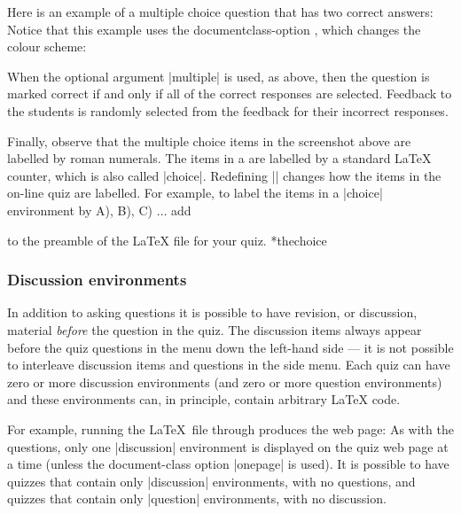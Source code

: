 \documentclass[svgnames]{article}
\makeatletter
\newcommand\macroIndex[1]{%
  \lowercase{\def\temp{#1}}%
  \expandafter\index\expandafter{\temp@\textbackslash#1}%
}
\makeatother
\begin{document}
  Here is an example of a multiple choice question that has
  two correct answers:
    \label{choice-multiple}
  Notice that this example uses the documentclass-option
  , which changes the colour scheme:

  When the optional argument \LatexCode|multiple| is used, as above, then the
  question is marked correct if and only if all of the correct responses
  are selected. Feedback to the students is randomly selected from the
  feedback for their incorrect responses.

  Finally, observe that the multiple choice items in the screenshot above
  are labelled by roman numerals. The items in a  are
  labelled by a standard \LaTeX{} counter, which is also called
  \LatexCode|choice|. Redefining \LatexCode|\thechoice| changes how the
  items in the on-line quiz are labelled. For example, to label the items
  in a \LatexCode|choice| environment by A), B), C) $\dots$ add
  \begin{latexcode}
    \renewcommand\thechoice{\Alph{choice})}
  \end{latexcode}
  to the preamble of the \LaTeX{} file for your quiz.
  *{thechoice}\macroIndex{thechoice}

  \subsubsection{Discussion environments}\label{SS:discussion}

  In addition to asking questions it is possible to have revision, or
  discussion, material \textit{before} the question in the quiz. The
  discussion items always appear before the quiz questions in the menu
  down the left-hand side --- it is not possible to interleave discussion
  items and questions in the side menu. Each quiz can have zero or more
  discussion environments (and zero or more question environments) and
  these environments can, in principle, contain arbitrary \LaTeX{} code.

  For example, running the \LaTeX\ file through \WebQuiz
  produces the web page:
  As with the questions, only one \LatexCode|discussion| environment is
  displayed on the quiz web page at a time (unless the document-class
  option \LatexCode|onepage| is used). It is possible to have quizzes
  that contain only \LatexCode|discussion| environments, with no questions, and
  quizzes that contain only \LatexCode|question| environments, with no
  discussion.
\end{document}
